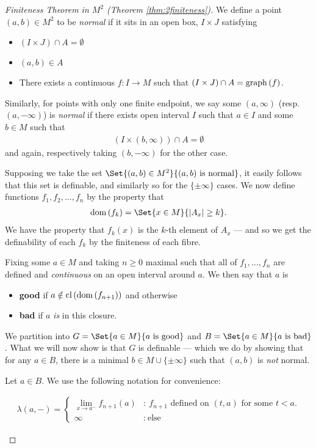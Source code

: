 \begin{proof}[Finiteness Theorem in $M^2$ (Theorem \ref{thm:2finiteness})]
	We define a point $(a, b) \in M^2$ to be \emph{normal} if it sits in an open box, $I \times J$ satisfying
	\begin{itemize}
		\item $(I \times J) \cap A = \emptyset$
		\item $(a, b) \in A$
		\item There exists a continuous $f \colon I \to M$ such that $(I \times J) \cap A = \operatorname{graph}\left(f\right)$.
	\end{itemize}

	Similarly, for points with only one finite endpoint, we say some $(a, \infty)$ (resp. $(a, - \infty)$) is \emph{normal} if there exists open interval $I$ such that $a \in I$ and some $b \in M$ such that
	\begin{align*}
		(I \times (b, \infty)) \cap A = \emptyset
	\end{align*}
	and again, respectively taking $(b, - \infty)$ for the other case.

	Supposing we take the set $\Set{(a, b) \in M^2}{(a, b) \ \textrm{is normal}}$, it easily follows that this set is definable, and similarly so for the $\{\pm \infty\}$ cases. We now define functions $f_1, f_2, \hdots, f_n$ by the property that
	\begin{align*}
		\dom{f_k} = \Set{x \in M}{\card{A_x} \geq k}.
	\end{align*}
	We have the property that $f_k(x)$ is the $k$-th element of $A_x$ — and so we get the definability of each $f_k$ by the finiteness of each fibre.

	Fixing some $a \in M$ and taking $n \geq 0$ maximal such that all of $f_1, \hdots, f_n$ are defined and \emph{continuous} on an open interval around $a$. We then say that $a$ is
	\begin{itemize}
		\item \textbf{good} if  $a \notin \operatorname{cl}\left(\operatorname{dom}\left(f_{n + 1}\right)\right)$ and otherwise
		\item \textbf{bad} if $a$ \emph{is} in this closure.
	\end{itemize}
	We partition into $G = \Set{a \in M}{a \ \textrm{is good}}$ and $B = \Set{a \in M}{a \ \textrm{is bad}}$. What we will now show is that $G$ is definable — which we do by showing that for any $a \in B$, there is a minimal $b \in M \cup \{\pm \infty \}$ such that $(a, b)$ is \emph{not} normal.

	Let $a \in B$. We use the following notation for convenience:
	\begin{description}
		\item
			\begin{align*}
						\lambda(a, -) = \begin{cases}
									      \displaystyle\lim_{x \to a^{-}} f_{n + 1}(a) & \colon \ \textrm{$f_{n+1}$ defined on $(t, a)$ for some $t < a$.} \\
									      \infty & \colon \ \textrm{else}
									   \end{cases}
			\end{align*}


\end{description}
\end{proof}
